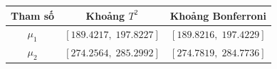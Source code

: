 \begin{center}\begin{tabular}{ccc}\toprule
Tham số & Khoảng $T^2$ & Khoảng Bonferroni\\\midrule
$\mu_1$ & $[189.4217,\;197.8227]$ & $[189.8216,\;197.4229]$\\
$\mu_2$ & $[274.2564,\;285.2992]$ & $[274.7819,\;284.7736]$\\
\bottomrule\end{tabular}\end{center}
